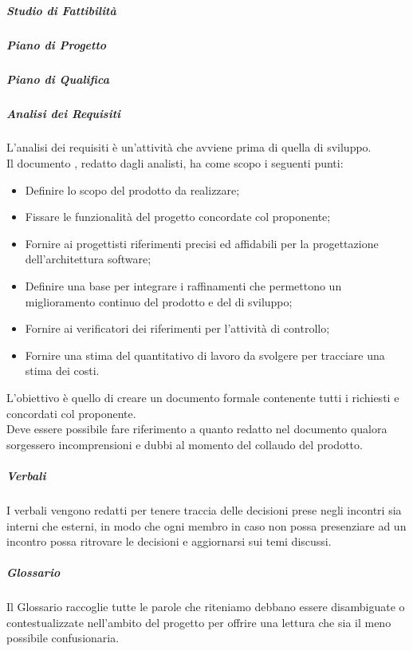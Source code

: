 \subparagraph*{Studio di Fattibilità}

\subparagraph*{Piano di Progetto}

\subparagraph*{Piano di Qualifica}


\subparagraph*{Analisi dei Requisiti}

L'analisi dei requisiti è un'attività che avviene prima di quella di sviluppo.\\
Il documento \AdR{}, redatto dagli analisti, ha come scopo i seguenti punti:
\begin{itemize}
\item Definire lo scopo del prodotto da realizzare;
\item Fissare le funzionalità del progetto concordate col proponente;
\item Fornire ai progettisti riferimenti precisi ed affidabili per la progettazione dell'architettura software;
\item Definire una base per integrare i raffinamenti che permettono un miglioramento continuo del prodotto e del  di sviluppo;
\item Fornire ai verificatori dei riferimenti per l’attività di controllo;
\item Fornire una stima del quantitativo di lavoro da svolgere per tracciare una stima dei costi. 
\end{itemize}

L'obiettivo è quello di creare un documento formale contenente tutti i  richiesti e concordati col proponente.\\
Deve essere possibile fare riferimento a quanto redatto nel documento \AdR{} qualora sorgessero incomprensioni e dubbi al momento del collaudo del prodotto.

\subparagraph*{Verbali}

I verbali vengono redatti per tenere traccia delle decisioni prese negli incontri sia interni che esterni, in modo che ogni membro in caso non possa presenziare ad un incontro possa ritrovare le decisioni e aggiornarsi sui temi discussi.

\subparagraph*{Glossario}

Il Glossario raccoglie tutte le parole che riteniamo debbano essere disambiguate o contestualizzate nell'ambito del progetto per offrire una lettura che sia il meno possibile confusionaria.

